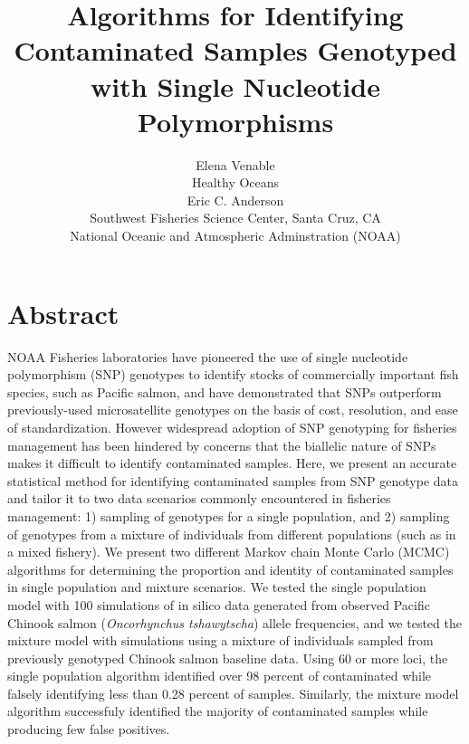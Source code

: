 \documentclass[12pt]{article}
\begin{document}
\normalem

\setlength{\parindent}{0cm}
\title{\textbf{Algorithms for Identifying Contaminated Samples Genotyped with Single Nucleotide Polymorphisms}}
\author{\Large Elena Venable\\ 
	Healthy Oceans\\
	Eric C. Anderson\\
	Southwest Fisheries Science Center, Santa Cruz, CA\\
	National Oceanic and Atmospheric Adminstration (NOAA)
  \date{}}
\maketitle

\section*{Abstract} 
NOAA Fisheries laboratories have pioneered the use of single nucleotide polymorphism (SNP) genotypes to identify stocks of commercially
important fish species, such as Pacific salmon, and have demonstrated that SNPs outperform previously-used microsatellite genotypes on the
basis of cost, resolution, and ease of standardization. However widespread adoption of SNP genotyping for fisheries management has been
hindered by concerns that the biallelic nature of SNPs makes it difficult to identify contaminated samples. Here, we present an accurate
statistical method for identifying contaminated samples from SNP genotype data and tailor it to two data scenarios commonly encountered in
fisheries management: 1) sampling of genotypes for a single population, and 2) sampling of genotypes from a mixture of individuals from
different populations (such as in a mixed fishery). We present two different Markov chain Monte Carlo (MCMC) algorithms for determining the
proportion and identity of contaminated samples in single population and mixture scenarios. We tested the single population model with 100
simulations of in silico data generated from observed Pacific Chinook salmon (\textit{Oncorhynchus tshawytscha}) allele frequencies, and we
tested the mixture model with simulations using a mixture of individuals sampled from previously genotyped Chinook salmon baseline data.
Using 60 or more loci, the single population algorithm identified over 98 percent of contaminated while falsely identifying less than 0.28
percent of samples.  Similarly, the mixture model algorithm successfuly identified the majority of contaminated samples while producing few
false positives.   
\end{document}
